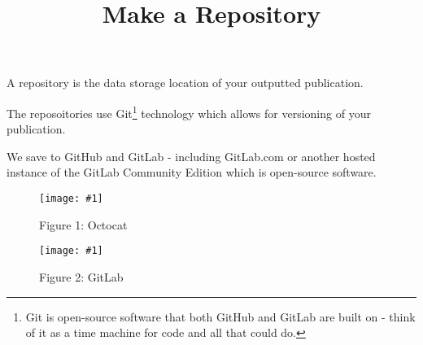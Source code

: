 \documentclass{article}
\newlength{\imgwidth}
\newcommand\scaledgraphics[2]{%
                
\settowidth{\imgwidth}{\texttt{[image: \#1]}}%
                
\setlength{\imgwidth}{\minof{\imgwidth}{#2\textwidth}}%
                
\texttt{[image: \#1]}%
                
}
\begin{document}
\title{Make a Repository}

\maketitle


A repository is the data storage location of your outputted publication.


The reposoitories use Git\footnote{Git is open-source software that both GitHub and GitLab are built on - think of it as a time machine for code and all that could do.} technology which allows for versioning of your publication.


We save to GitHub and GitLab\autocite{PerkelJeffrey2016} - including GitLab.com or another hosted instance of the GitLab Community Edition which is open-source software.

\begin{figure}
\scaledgraphics{d095295c-b3e6-4e52-be14-226bdafee26e.png}{0.5}
\caption*{Figure 1: Octocat}\label{F44428261}
\end{figure}

\begin{figure}
\scaledgraphics{f729a128-33fa-4ec4-92b1-bf0eade111b9.jpg}{0.5}
\caption*{Figure 2: GitLab}\label{F8019541}
\end{figure}


\printbibliography[title={Bibliography}]
\end{document}
